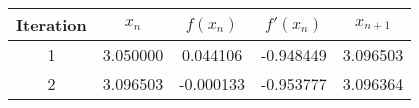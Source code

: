 \begin{tabular}{|c|c|c|c|c|}
\hline
Iteration & $x_n$ & $f(x_n)$ & $f'(x_n)$ & $x_{n+1}$ \\
\hline
1 & 3.050000 & 0.044106 & -0.948449 & 3.096503 \\
\hline
2 & 3.096503 & -0.000133 & -0.953777 & 3.096364 \\
\hline
\end{tabular}